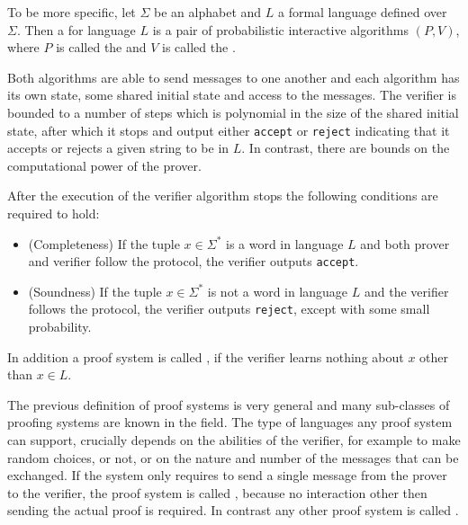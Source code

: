 To be more specific, let $\Sigma$ be an alphabet and $L$ a formal language defined over $\Sigma$. Then a  for language $L$ is a pair of probabilistic interactive algorithms $(P,V)$, where $P$ is called the  and $V$ is called the . 

Both algorithms are able to send messages to one another and each algorithm has its own state, some shared initial state and access to the messages. The verifier is bounded to a number of steps which is polynomial in the size of the shared initial state, after which it stops and output either \texttt{accept} or \texttt{reject} indicating that it accepts or rejects a given string to be in $L$. In contrast, there are bounds on the computational power of the prover.

After the execution of the verifier algorithm stops the following conditions are required to hold:
\begin{itemize}
\item (Completeness) If the tuple $x\in \Sigma^*$ is a word in language $L$ and both prover and verifier follow the protocol, the verifier outputs \texttt{accept}.
\item (Soundness) If the tuple $x\in \Sigma^*$ is not a word in language $L$ and the verifier follows the protocol, the verifier outputs \texttt{reject}, except with some small probability.
\end{itemize}
In addition a proof system is called , if the verifier learns nothing about $x$ other than $x\in L$. 

The previous definition of proof systems is very general and many sub-classes of proofing systems are known in the field. The type of languages any proof system can support, crucially depends on the abilities of the verifier, for example to make random choices, or not, or on the nature and number of the messages that can be exchanged. If the system only requires to send a single message from the prover to the verifier, the proof system is called , because no interaction other then sending the actual proof is required. In contrast any other proof system is called .

